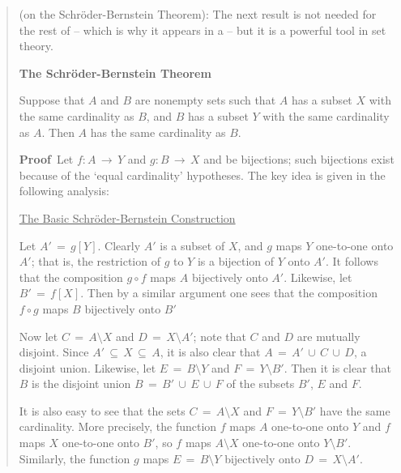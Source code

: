 {%
\begin{quotation}
{\footnotesize \underline{\Note} (on the Schr\"{o}der-Bernstein Theorem): 
    The next result is not needed for the rest of {\TheseNotes} -- which is why it appears in a \Note -- but it is a powerful tool in set theory.

\V

        {\bf The Schr\"{o}der-Bernstein Theorem}

\V

        Suppose that $A$ and $B$ are nonempty sets such that $A$ has a subset $X$ with the same cardinality as $B$,
    and $B$ has a subset $Y$ with the same cardinality as $A$.
    Then $A$ has the same cardinality as $B$.

\V

        {\bf Proof}\,  Let $f:A \,{\rightarrow}\, Y$ and $g:B \,{\rightarrow}\, X$ and be bijections;
    such bijections exist because of the `equal cardinality' hypotheses.
    The key idea is given in the following analysis:

\V

       \underline{The Basic Schr\"{o}der-Bernstein Construction}

        Let $A' \,=\, g[Y]$. Clearly $A'$ is a subset of $X$, and $g$ maps $Y$ one-to-one onto $A'$;
    that is, the restriction of $g$ to $Y$ is a bijection of $Y$ onto $A'$. It follows that the composition $g{\circ}f$ maps $A$ bijectively onto $A'$.
    Likewise, let $B' \,=\, f[X]$. Then by a similar argument one sees that the composition $f{\circ}g$ maps $B$ bijectively onto $B'$

        Now let $C \,=\, A{\setminus}X$ and $D \,=\, X{\setminus}A'$; note that $C$ and $D$ are mutually disjoint.
    Since $A' \,{\subseteq}\, X \,{\subseteq}\, A$, it is also clear that $A \,=\, A'\,{\cup}\,C\,{\cup}\,D$, a disjoint union.
    Likewise, let $E \,=\, B{\setminus}Y$ and $F \,=\, Y{\setminus}B'$. Then it is clear that $B$ is the disjoint union $B \,=\, B'\,{\cup}\,E\,{\cup}\,F$ of the subsets $B'$, $E$ and $F$.

        It is also easy to see that the sets $C \,=\, A{\setminus}X$ and $F \,=\, Y{\setminus}B'$ have the same cardinality.
    More precisely, the function $f$ maps $A$ one-to-one onto $Y$ and $f$ maps $X$ one-to-one onto $B'$,
    so $f$ maps $A{\setminus}X$ one-to-one onto $Y{\setminus}B'$.
    Similarly, the function $g$ maps $E \,=\, B{\setminus}Y$ bijectively onto $D \,=\, X{\setminus}A'$.

}
\end{quotation}}
